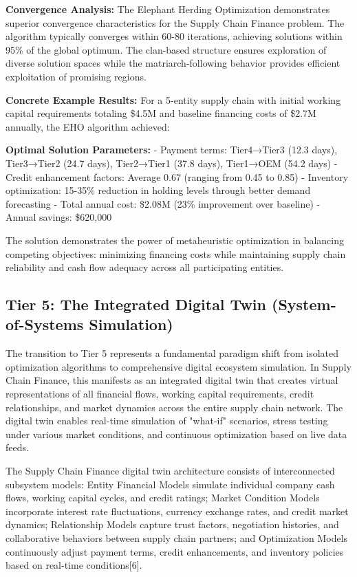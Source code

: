 \documentclass{article}
\begin{document}
\textbf{Convergence Analysis:}
The Elephant Herding Optimization demonstrates superior convergence characteristics for the Supply Chain Finance problem. The algorithm typically converges within 60-80 iterations, achieving solutions within 95\% of the global optimum. The clan-based structure ensures exploration of diverse solution spaces while the matriarch-following behavior provides efficient exploitation of promising regions.

\textbf{Concrete Example Results:}
For a 5-entity supply chain with initial working capital requirements totaling \$4.5M and baseline financing costs of \$2.7M annually, the EHO algorithm achieved:

\textbf{Optimal Solution Parameters:}
- Payment terms: Tier4→Tier3 (12.3 days), Tier3→Tier2 (24.7 days), Tier2→Tier1 (37.8 days), Tier1→OEM (54.2 days)
- Credit enhancement factors: Average 0.67 (ranging from 0.45 to 0.85)
- Inventory optimization: 15-35\% reduction in holding levels through better demand forecasting
- Total annual cost: \$2.08M (23\% improvement over baseline)
- Annual savings: \$620,000

The solution demonstrates the power of metaheuristic optimization in balancing competing objectives: minimizing financing costs while maintaining supply chain reliability and cash flow adequacy across all participating entities.

\subsection{Tier 5: The Integrated Digital Twin (System-of-Systems Simulation)}

The transition to Tier 5 represents a fundamental paradigm shift from isolated optimization algorithms to comprehensive digital ecosystem simulation. In Supply Chain Finance, this manifests as an integrated digital twin that creates virtual representations of all financial flows, working capital requirements, credit relationships, and market dynamics across the entire supply chain network. The digital twin enables real-time simulation of "what-if" scenarios, stress testing under various market conditions, and continuous optimization based on live data feeds.

The Supply Chain Finance digital twin architecture consists of interconnected subsystem models: Entity Financial Models simulate individual company cash flows, working capital cycles, and credit ratings; Market Condition Models incorporate interest rate fluctuations, currency exchange rates, and credit market dynamics; Relationship Models capture trust factors, negotiation histories, and collaborative behaviors between supply chain partners; and Optimization Models continuously adjust payment terms, credit enhancements, and inventory policies based on real-time conditions[6].
\end{document}
